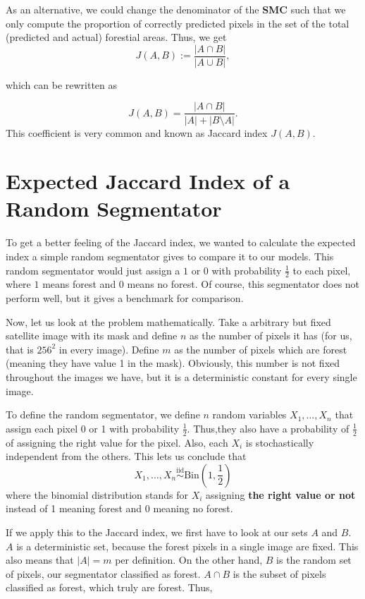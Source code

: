 As an alternative, we could change the denominator of the \textbf{SMC} such that we only compute the proportion of correctly predicted pixels in the set of the total (predicted and actual) forestial areas. Thus, we get
\begin{equation}
	J(A, B) := \frac{|A \cap B|}{|A \cup B|},
\end{equation}

which can be rewritten as

\begin{equation}
	J(A, B) = \frac{|A \cap B|}{|A| + |B \setminus A |}.
\end{equation}
This coefficient is very common and known as Jaccard index $J(A,B)$.

\section{Expected Jaccard Index of a Random Segmentator}
To get a better feeling of the Jaccard index, we wanted to calculate the expected index a simple random segmentator gives to compare it to our models. This random segmentator would just assign a $1$ or $0$ with probability $\frac{1}{2}$ to each pixel, where $1$ means forest and $0$ means no forest. Of course, this segmentator does not perform well, but it gives a benchmark for comparison.

Now, let us look at the problem mathematically. Take a arbitrary but fixed satellite image with its mask and define $n$ as the number of pixels it has (for us, that is $256^2$ in every image). Define $m$ as the number of pixels which are forest (meaning they have value 1 in the mask). Obviously, this number is not fixed throughout the images we have, but it is a deterministic constant for every single image.

To define the random segmentator, we define $n$ random variables $X_1, \dots, X_n$ that assign each pixel 0 or 1 with probability $\frac{1}{2}$. Thus,they also have a probability of $\frac{1}{2}$ of assigning the right value for the pixel. Also, each $X_i$ is stochastically independent from the others. This lets us conclude that
\begin{equation}
  X_1, \dots, X_n \overset{\mathrm{iid}}{\sim} \text{Bin}(1, \frac{1}{2})
\end{equation}
where the binomial distribution stands for $X_i$ assigning \textbf{the right value or not} instead of 1 meaning forest and 0 meaning no forest.

If we apply this to the Jaccard index, we first have to look at our sets $A$ and $B$. $A$ is a deterministic set, because the forest pixels in a single image are fixed. This also means that $|A|=m$ per definition. On the other hand, $B$ is the random set of pixels, our segmentator classified as forest. $A \cap B$ is the subset of pixels classified as forest, which truly are forest. Thus,

